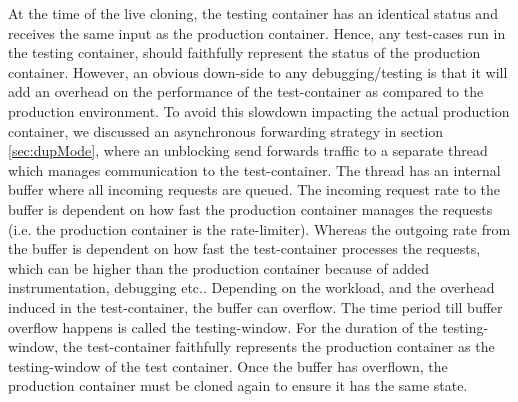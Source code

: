 At the time of the live cloning, the testing container has an identical status and receives the same input as the production container. 
Hence, any test-cases run in the testing container, should faithfully represent the status of the production container.
However, an obvious down-side to any debugging/testing is that it will add an overhead on the performance of the test-container as compared to the production environment.
To avoid this slowdown impacting the actual production container, we discussed an asynchronous forwarding strategy in section \ref{sec:dupMode}, where an unblocking send forwards traffic to a separate thread which manages communication to the test-container. 
The thread has an internal buffer where all incoming requests are queued. 
The incoming request rate to the buffer is dependent on how fast the production container manages the requests (i.e. the production container is the rate-limiter).
Whereas the outgoing rate from the buffer is dependent on how fast the test-container processes the requests, which can be higher than the production container because of added instrumentation, debugging etc..
Depending on the workload, and the overhead induced in the test-container, the buffer can overflow. 
The time period till buffer overflow happens is called the testing-window.
For the duration of the testing-window, the test-container faithfully represents the production container as the testing-window of the test container. 
Once the buffer has overflown, the production container must be cloned again to ensure it has the same state.

